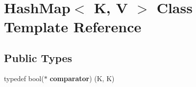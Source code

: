 \hypertarget{class_hash_map}{}\section{Hash\+Map$<$ K, V $>$ Class Template Reference}
\label{class_hash_map}
\subsection*{Public Types}
\begin{DoxyCompactItemize}
\item 
\hypertarget{class_hash_map_ad069a14b9dbe415654f0a75d2f75903a}{}typedef bool($\ast$ {\bfseries comparator}) (K, K)\label{class_hash_map_ad069a14b9dbe415654f0a75d2f75903a}

\end{DoxyCompactItemize}
